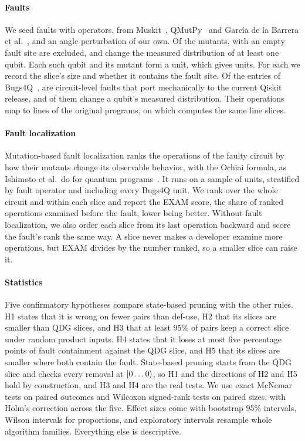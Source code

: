 \paragraph*{Faults}
We seed faults with \numMutOperators{} operators, \numMutPublished{} from Muskit~\cite{mendiluze2021muskit},
QMutPy~\cite{fortunato2022qmutpy} and García de la Barrera et al.~\cite{garcia2022testing}, and an angle
perturbation of our own. Of the \numMutants{} mutants, \numMutantsExcluded{} with an empty fault site are
excluded, and \numMutantsKilled{} change the measured distribution of at least one qubit. Each such qubit
and its mutant form a unit, which gives \numRqThreeUnits{} units. For each we record the slice's size and whether it contains the fault site. Of the \numBugsFourQTriaged{} entries of Bugs4Q~\cite{zhao2023bugs4q},
\numBugsFourQIncluded{} are circuit-level faults that port mechanically to the current Qiskit release, and
\numBugsFourQKilled{} of them change a qubit's measured distribution. Their operations map to lines of the original programs, on which \tool{} computes the same line slices.

\paragraph*{Fault localization}
Mutation-based fault localization ranks the operations of the faulty circuit by how their mutants
change its observable behavior, with the Ochiai formula, as Ishimoto et al.\ do for quantum
programs~\cite{ishimoto2025mbfl}. It runs on a sample of
\numMbflUnits{} units, stratified by fault operator and including every Bugs4Q unit. We rank over the whole
circuit and within each slice and report the EXAM score, the share of ranked operations examined before
the fault, lower being better. Without fault localization, we also order each slice from its
last operation backward and score the fault's rank the same way. A slice never makes a developer examine
more operations, but EXAM divides by the number ranked, so a smaller slice can raise it.

\paragraph*{Statistics}
Five confirmatory hypotheses compare state-based pruning with the other rules. H1 states that it is wrong
on fewer pairs than def-use, H2 that its slices are smaller than QDG slices, and H3 that at least 95\% of
pairs keep a correct slice under random product inputs. H4 states that it loses at most five percentage
points of fault containment against the QDG slice, and H5 that its slices are smaller where both contain
the fault. State-based pruning starts from the QDG slice and checks every removal at $\lvert 0\dots0\rangle$, so H1
and the directions of H2 and H5 hold by construction, and H3 and H4 are the real tests. We use exact
McNemar tests on paired outcomes and Wilcoxon signed-rank tests on paired sizes, with Holm's correction
across the five. Effect sizes come with bootstrap 95\% intervals, Wilson intervals for proportions, and exploratory intervals resample whole
algorithm families. Everything else is descriptive.
